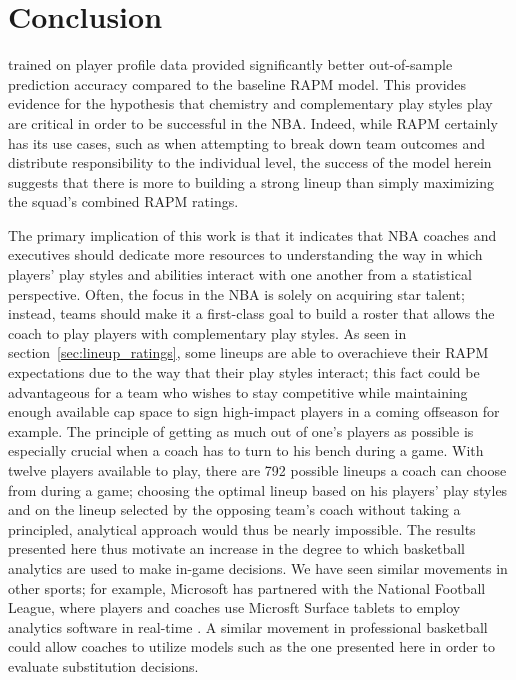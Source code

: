 \chapter{Conclusion}
\label{conclusion}

 trained on player
profile data provided significantly better out-of-sample prediction accuracy
compared to the baseline RAPM model. This provides evidence for the hypothesis that
chemistry and complementary play styles play are critical in order to be successful
in the NBA.  Indeed, while RAPM certainly has its use cases, such as when attempting
to break down team outcomes and distribute responsibility to the individual level,
the success of the model herein suggests that there is more to building a strong
lineup than simply maximizing the squad's combined RAPM ratings.

The primary implication of this work is that it indicates that NBA coaches and
executives should dedicate more resources to understanding the way in which players'
play styles and abilities interact with one another from a statistical perspective.
Often, the focus in the NBA is solely on acquiring star talent; instead, teams
should make it a first-class goal to build a roster that allows the coach to play
players with complementary play styles. As seen in section~\ref{sec:lineup_ratings},
some lineups are able to overachieve their RAPM expectations due to the way that
their play styles interact; this fact could be advantageous for a team who wishes to
stay competitive while maintaining enough available cap space to sign high-impact
players in a coming offseason for example.  The principle of getting as much out of
one's players as possible is especially crucial when a coach has to turn to his
bench during a game. With twelve players available to play, there are 792 possible
lineups a coach can choose from during a game; choosing the optimal lineup based on
his players' play styles and on the lineup selected by the opposing team's coach
without taking a principled, analytical approach would thus be nearly impossible.
The results presented here thus motivate an increase in the degree to which
basketball analytics are used to make in-game decisions. We have seen similar
movements in other sports; for example, Microsoft has partnered with the National
Football League, where players and coaches use Microsft Surface tablets to employ
analytics software in real-time \cite{Geekwire}.  A similar movement in professional
basketball could allow coaches to utilize models such as the one presented here in
order to evaluate substitution decisions.

